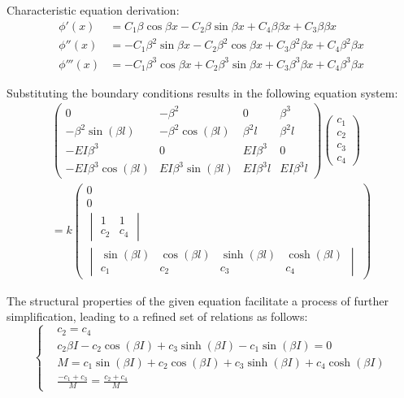 \documentclass[conference]{IEEEtran}
\begin{document}
Characteristic equation derivation:
\begin{equation}
\begin{aligned}
\phi'(x) &= C_1\beta \cos \beta x - C_2\beta \sin \beta x + C_4\beta \beta x + C_3\beta \beta x \\
\phi''(x) &= -C_1 \beta^2 \sin \beta x - C_2 \beta^2 \cos \beta x + C_3 \beta^2\beta{}x + C_4 \beta^2\beta{}x \\
\phi'''(x) &= -C_1 \beta^3 \cos \beta x + C_2 \beta^3 \sin \beta x + C_3 \beta^3\beta{}x + C_4 \beta^3\beta{}x
\end{aligned}
\end{equation}

Substituting the boundary conditions results in the following equation system:
\begin{equation}
\begin{aligned}
\begin{pmatrix}
0 & -\beta^2 & 0 & \beta^3 \\
-\beta^2 \sin(\beta l) & -\beta^2 \cos(\beta l) & \beta^2 l & \beta^2 l \\
-EI\beta^3 & 0 & EI\beta^3 & 0 \\
-EI\beta^3 \cos(\beta l) & EI\beta^3 \sin(\beta l) & EI\beta^3 l & EI\beta^3 l
\end{pmatrix}
\begin{pmatrix}
c_1 \\
c_2 \\
c_3 \\
c_4
\end{pmatrix}
\\=k
\begin{pmatrix}
0 \\
0 \\
 \begin{vmatrix} 1 & 1 \\ c_2 & c_4 \end{vmatrix} \\
 \begin{vmatrix}
\sin(\beta l) & \cos(\beta l) & \sinh(\beta l) & \cosh(\beta l) \\
c_1 & c_2 & c_3 & c_4
\end{vmatrix}
\end{pmatrix}
\end{aligned}
\end{equation}

The structural properties of the given equation facilitate a process of further simplification, leading to a refined set of relations as follows:
\begin{equation}
\left\{
\begin{aligned}
& c_2 = c_4 \\
& c_2 \beta I - c_2 \cos(\beta I) + c_3 \sinh(\beta I) - c_1 \sin(\beta I) = 0 \\
& M=c_1 \sin(\beta I) + c_2 \cos(\beta I) + c_3 \sinh(\beta I) + c_4 \cosh(\beta I)\\
& \frac{-c_1 + c_3}{M} = \frac{c_2 + c_4}{M}
\end{aligned}
\right.
\end{equation}
\end{document}
